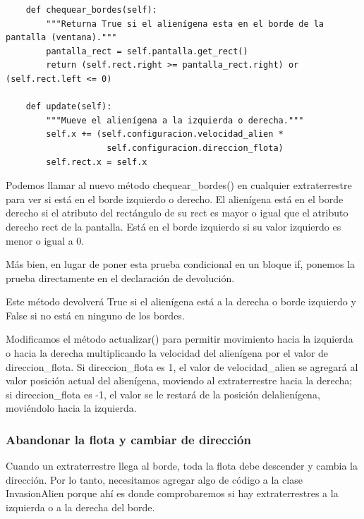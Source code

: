 \hspace{-1.6cm}{\ttfamily \scriptsize alien.py}  \vspace{-0.5cm}
\begin{lstlisting}	
    def chequear_bordes(self):
        """Returna True si el alienígena esta en el borde de la pantalla (ventana)."""
        pantalla_rect = self.pantalla.get_rect()
        return (self.rect.right >= pantalla_rect.right) or (self.rect.left <= 0)
    
    def update(self):
        """Mueve el alienígena a la izquierda o derecha."""
        self.x += (self.configuracion.velocidad_alien * 
                    self.configuracion.direccion_flota)
        self.rect.x = self.x
\end{lstlisting}


Podemos llamar al nuevo método {\ttfamily chequear\_bordes()} en cualquier extraterrestre para ver si
está en el borde izquierdo o derecho. 
El alienígena está en el borde derecho si el atributo del rectángulo de su {\ttfamily rect} es mayor o igual que el atributo derecho {\ttfamily rect}  de la pantalla. Está en el borde izquierdo si su valor izquierdo es menor o igual a 0.

Más bien, en lugar de poner esta prueba condicional en un bloque {\ttfamily if}, ponemos la prueba directamente en el
declaración de devolución. 

Este método devolverá {\ttfamily True} si el alienígena está a la derecha o borde izquierdo y {\ttfamily False} si no está en ninguno de los bordes.

Modificamos el método  {\ttfamily actualizar()} para permitir movimiento hacia la izquierda o hacia la derecha 
multiplicando la velocidad del alienígena por el valor de {\ttfamily direccion\_flota}. 
Si {\ttfamily direccion\_flota} es 1, el valor de  {\ttfamily  velocidad\_alien} se agregará al valor posición actual
del alienígena, moviendo al extraterrestre hacia la derecha; si {\ttfamily direccion\_flota} es -1, el valor se le restará
de la posición delalienígena, moviéndolo hacia la izquierda.

\subsubsection{Abandonar la flota y cambiar de dirección}

Cuando un extraterrestre llega al borde, toda la flota debe descender y
cambia la dirección. Por lo tanto, necesitamos agregar algo de código a la clase {\ttfamily InvasionAlien} 
porque ahí es donde comprobaremos si hay extraterrestres a la izquierda o a la derecha del borde. 

